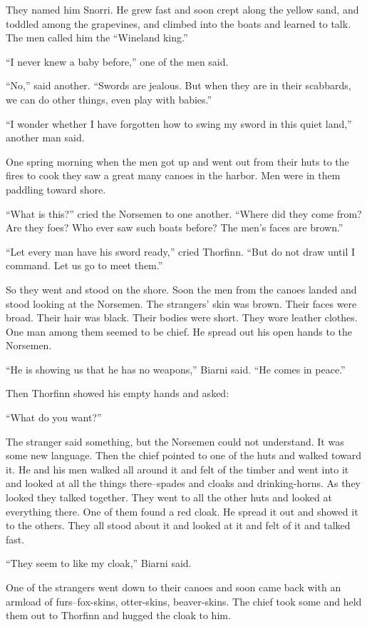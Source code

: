 They named him Snorri. He grew fast and soon crept along the yellow
sand, and toddled among the grapevines, and climbed into the boats and
learned to talk. The men called him the ``Wineland king.''

``I never knew a baby before,'' one of the men said.

``No,'' said another. ``Swords are jealous. But when they are in their
scabbards, we can do other things, even play with babies.''

``I wonder whether I have forgotten how to swing my sword in this quiet
land,'' another man said.

One spring morning when the men got up and went out from their huts to
the fires to cook they saw a great many canoes in the harbor. Men were
in them paddling toward shore.

``What is this?'' cried the Norsemen to one another. ``Where did they
come from? Are they foes? Who ever saw such boats before? The men's
faces are brown.''

``Let every man have his sword ready,'' cried Thorfinn. ``But do not
draw until I command. Let us go to meet them.''

So they went and stood on the shore. Soon the men from the canoes landed
and stood looking at the Norsemen. The strangers' skin was brown. Their
faces were broad. Their hair was black. Their bodies were short. They
wore leather clothes. One man among them seemed to be chief. He spread
out his open hands to the Norsemen.

``He is showing us that he has no weapons,'' Biarni said. ``He comes in
peace.''

Then Thorfinn showed his empty hands and asked:

``What do you want?''

The stranger said something, but the Norsemen could not understand. It
was some new language. Then the chief pointed to one of the huts and
walked toward it. He and his men walked all around it and felt of the
timber and went into it and looked at all the things there--spades and
cloaks and drinking-horns. As they looked they talked together. They
went to all the other huts and looked at everything there. One of them
found a red cloak. He spread it out and showed it to the others. They
all stood about it and looked at it and felt of it and talked fast.

``They seem to like my cloak,'' Biarni said.

One of the strangers went down to their canoes and soon came back with
an armload of furs--fox-skins, otter-skins, beaver-skins. The chief took
some and held them out to Thorfinn and hugged the cloak to him.

